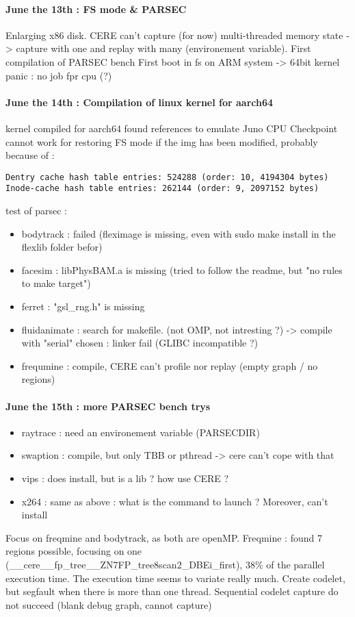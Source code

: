 \documentclass{article}
\begin{document}
\paragraph*{June the 13th : FS mode \& PARSEC}
Enlarging x86 disk.
CERE can't capture (for now) multi-threaded memory state -> capture with one and replay with many (environement variable).
First compilation of PARSEC bench
First boot in fs on ARM system -> 64bit kernel panic : no job fpr cpu (?)

\paragraph*{June the 14th : Compilation of linux kernel for aarch64}
kernel compiled for aarch64
found references to emulate Juno CPU
Checkpoint cannot work for restoring FS mode if the img has been modified, probably because of :
\begin{lstlisting}
Dentry cache hash table entries: 524288 (order: 10, 4194304 bytes)
Inode-cache hash table entries: 262144 (order: 9, 2097152 bytes)
\end{lstlisting}
test of parsec :
\begin{itemize}
\item bodytrack : failed (fleximage is missing, even with sudo make install in the flexlib folder befor)
\item facesim : libPhysBAM.a is missing (tried to follow the readme, but "no rules to make target")
\item ferret : "gsl\_rng.h" is missing
\item fluidanimate : search for makefile. (not OMP, not intresting ?) -> compile with "serial" chosen : linker fail (GLIBC incompatible ?)
\item frequmine : compile, CERE can't profile nor replay (empty graph / no regions)
\end{itemize}

\paragraph*{June the 15th : more PARSEC bench trys}
\begin{itemize}
\item raytrace : need an environement variable (PARSECDIR)
\item swaption : compile, but only TBB or pthread -> cere can't cope with that
\item vips : does install, but is a lib ? how use CERE ?
\item x264 : same as above : what is the command to launch ? Moreover, can't install
\end{itemize}
Focus on freqmine and bodytrack, as both are openMP.
Freqmine : found 7 regions possible, focusing on one (\_\_cere\_\_fp\_tree\_\_ZN7FP\_tree8scan2\_DBEi\_first), $38\%$ of the parallel execution time. The execution time seems to variate really much. Create codelet, but segfault when there is more than one thread.
Sequential codelet capture do not succeed (blank debug graph, cannot capture)
\end{document}
